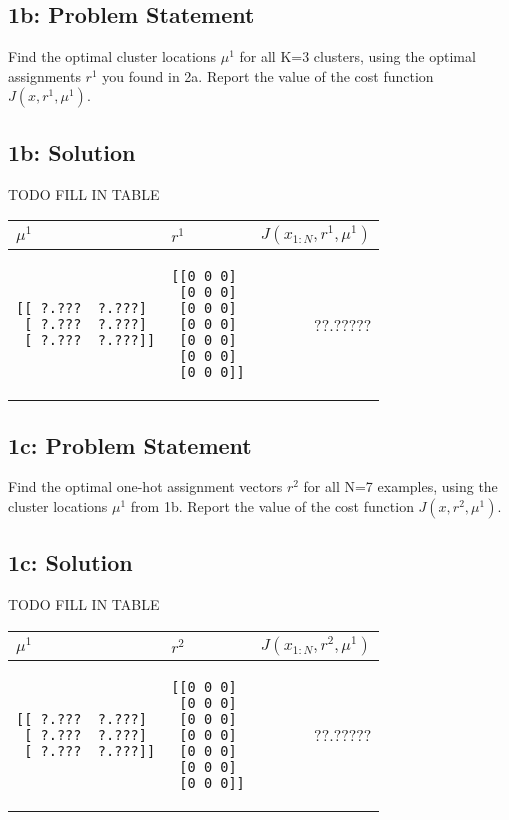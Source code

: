 \documentclass[10pt]{article}
\newcommand{\officialdirections}[1]{{\color{purple} #1}}
\begin{document}
\officialdirections{
\subsection*{1b: Problem Statement}
 Find the optimal cluster locations $\mu^1$ for all K=3 clusters, using the optimal assignments $r^1$ you found in 2a. Report the value of the cost function $J(x, r^1, \mu^1)$.}

\subsection{1b: Solution}
TODO FILL IN TABLE

\begin{tabular}{p{5cm} | p{5cm} | r}
$\mu^1$ & $r^1$ & $J(x_{1:N}, r^1, \mu^1)$
\\
\midrule
\begin{verbatim}
[[ ?.???  ?.???]
 [ ?.???  ?.???]
 [ ?.???  ?.???]]
\end{verbatim}
&	
\begin{verbatim}
[[0 0 0]
 [0 0 0]
 [0 0 0]
 [0 0 0]
 [0 0 0]
 [0 0 0]
 [0 0 0]]
\end{verbatim}
&
 ??.?????
\end{tabular}

\officialdirections{
\subsection*{1c: Problem Statement}
Find the optimal one-hot assignment vectors $r^2$ for all N=7 examples, using the cluster locations $\mu^1$ from 1b. Report the value of the cost function $J(x, r^2, \mu^1)$.
}

\subsection{1c: Solution}
TODO FILL IN TABLE

\begin{tabular}{p{5cm} | p{5cm} | r}
$\mu^1$ & $r^2$ & $J(x_{1:N}, r^2, \mu^1)$
\\
\midrule
\begin{verbatim}
[[ ?.???  ?.???]
 [ ?.???  ?.???]
 [ ?.???  ?.???]]
\end{verbatim}
&	
\begin{verbatim}
[[0 0 0]
 [0 0 0]
 [0 0 0]
 [0 0 0]
 [0 0 0]
 [0 0 0]
 [0 0 0]]
\end{verbatim}
&
 ??.?????
\end{tabular}
\end{document}
